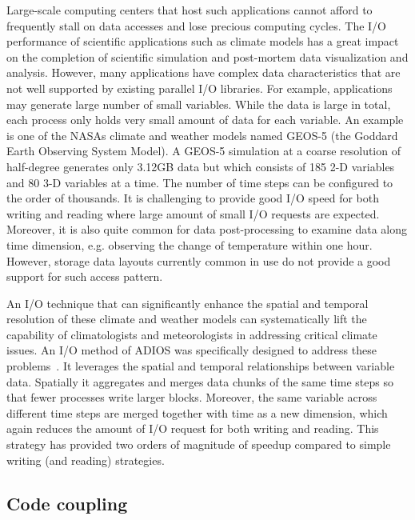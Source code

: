Large-scale computing centers that host such applications cannot afford to frequently stall on data
accesses and lose precious computing cycles. The I/O performance of scientific applications such as
climate models has a great impact on the completion of scientific simulation and post-mortem data
visualization and analysis. However, many applications have complex data characteristics that are
not well supported by existing parallel I/O libraries. For example, applications may generate large
number of small variables. While the data is large in total, each process only holds very small
amount of data for each variable. An example is one of the NASAs climate and weather models named
GEOS-5 (the Goddard Earth Observing System Model). A GEOS-5 simulation at a coarse resolution of
half-degree generates only 3.12GB data but which consists of 185 2-D variables and 80 3-D variables
at a time. The number of time steps can be configured to the order of thousands. It is challenging
to provide good I/O speed for both writing and reading where large amount of small I/O requests are
expected. Moreover, it is also quite common for data post-processing to examine data along time
dimension, e.g. observing the change of temperature within one hour. However, storage data layouts
currently common in use do not provide a good support for such access pattern.

An I/O technique that can significantly enhance the spatial and temporal resolution of these climate
and weather models can systematically lift the capability of climatologists and meteorologists in
addressing critical climate issues. An I/O method of ADIOS was specifically designed to address
these problems~\cite{ADIOS:Tian:msst13}. It leverages the spatial and temporal relationships between
variable data. Spatially it aggregates and merges data chunks of the same time steps so that fewer
processes write larger blocks. Moreover, the same variable across different time steps are merged
together with time as a new dimension, which again reduces the amount of I/O request for both
writing and reading. This strategy has provided two orders of magnitude of speedup compared to
simple writing (and reading) strategies.




%
%
\subsection{Code coupling}

